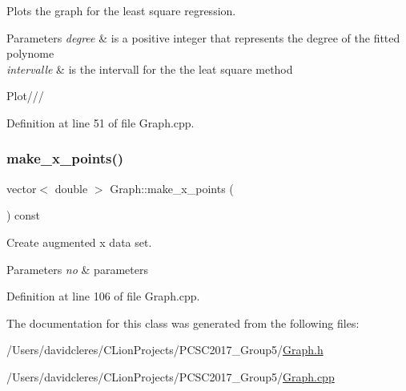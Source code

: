 Plots the graph for the least square regression. 


\begin{DoxyParams}{Parameters}
{\em degree} & is a positive integer that represents the degree of the fitted polynome \\
\hline
{\em intervalle} & is the intervall for the the leat square method \\
\hline
\end{DoxyParams}
Plot/// 

Definition at line 51 of file Graph.\+cpp.

\mbox{\label{class_graph_a74825a258c65f3706369b367874b7f7b}} 
\subsubsection{\texorpdfstring{make\+\_\+x\+\_\+points()}{make\_x\_points()}}
{\footnotesize\ttfamily vector$<$ double $>$ Graph\+::make\+\_\+x\+\_\+points (\begin{DoxyParamCaption}{ }\end{DoxyParamCaption}) const}



Create augmented x data set. 


\begin{DoxyParams}{Parameters}
{\em no} & parameters \\
\hline
\end{DoxyParams}


Definition at line 106 of file Graph.\+cpp.



The documentation for this class was generated from the following files\+:\begin{DoxyCompactItemize}
\item 
/\+Users/davidcleres/\+C\+Lion\+Projects/\+P\+C\+S\+C2017\+\_\+\+Group5/\mbox{\hyperlink{_graph_8h}{Graph.\+h}}\item 
/\+Users/davidcleres/\+C\+Lion\+Projects/\+P\+C\+S\+C2017\+\_\+\+Group5/\mbox{\hyperlink{_graph_8cpp}{Graph.\+cpp}}\end{DoxyCompactItemize}
